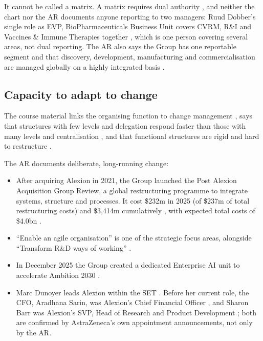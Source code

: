 \begin{sourceslimit}
It cannot be called a matrix. A matrix requires dual authority \cite[pp.~21--22]{ORG}, and neither the chart nor the AR documents anyone reporting to two managers: Ruud Dobber's single role as EVP, BioPharmaceuticals Business Unit covers CVRM, R\&I and Vaccines \& Immune Therapies together \cite[p.~70]{AR}, which is one person covering several areas, not dual reporting. The AR also says the Group has one reportable segment and that discovery, development, manufacturing and commercialisation are managed globally on a highly integrated basis \cite[p.~147]{AR}.
\end{sourceslimit}

\subsection{Capacity to adapt to change}

The course material links the organising function to change management \cite[pp.~4--5]{ORG}, says that structures with few levels and delegation respond faster than those with many levels and centralisation \cite[p.~7]{ORG}, and that functional structures are rigid and hard to restructure \cite[p.~16]{ORG}.

The AR documents deliberate, long-running change:

\begin{itemize}
\item After acquiring Alexion in 2021, the Group launched the Post Alexion Acquisition Group Review, a global restructuring programme to integrate systems, structure and processes. It cost \$232m in 2025 (of \$237m of total restructuring costs) and \$3,414m cumulatively \cite[p.~142]{AR}, with expected total costs of \$4.0bn \cite[p.~59]{AR}.
\item ``Enable an agile organisation'' is one of the strategic focus areas, alongside ``Transform R\&D ways of working'' \cite[p.~11]{AR}.
\item In December 2025 the Group created a dedicated Enterprise AI unit to accelerate Ambition 2030 \cite[p.~36]{AR}.
\item Marc Dunoyer leads Alexion within the SET \cite[p.~70]{AR}. Before her current role, the CFO, Aradhana Sarin, was Alexion's Chief Financial Officer \cite{SARIN21}, and Sharon Barr was Alexion's SVP, Head of Research and Product Development \cite{BARR23}; both are confirmed by AstraZeneca's own appointment announcements, not only by the AR.
\end{itemize}


